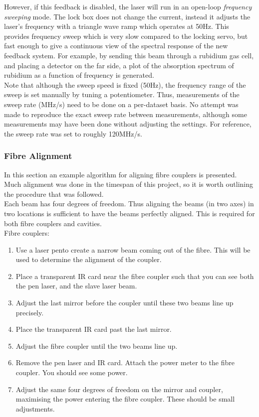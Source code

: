 However, if this feedback is disabled, the laser will run in an open-loop \emph{frequency sweeping} mode.  The lock box does not change the current, instead it adjusts the laser's frequency with a triangle wave ramp which operates at 50Hz.  This provides frequency sweep which is very slow compared to the locking servo, but fast enough to give a continuous view of the spectral response of the new feedback system.  For example, by sending this beam through a rubidium gas cell, and placing a detector on the far side, a plot of the absorption spectrum of rubidium as a function of frequency is generated. \\

Note that although the sweep speed is fixed (50Hz), the frequency range of the sweep is set manually by tuning a potentiometer.  Thus, measurements of the sweep rate (MHz/s) need to be done on a per-dataset basis.  No attempt was made to reproduce the exact sweep rate between measurements, although some measurements may have been done without adjusting the settings.  For reference, the sweep rate was set to roughly 120MHz/s. \\

    \subsubsection{Fibre Alignment}

In this section an  example algorithm for aligning fibre couplers is presented.  Much alignment was done in the timespan of this project, so it is worth outlining the procedure that was followed. \\

Each beam has four degrees of freedom.  Thus aligning the beams (in two axes) in two locations is sufficient to have the beams perfectly aligned.  This is required for both fibre couplers and cavities. \\

Fibre couplers:

\begin{enumerate}
 \item Use a laser pen\footnotemark to create a narrow beam coming out of the fibre.  This will be used to determine the alignment of the coupler.
 \item Place a transparent IR card near the fibre coupler such that you can see both the pen laser, and the slave laser beam.
 \item Adjust the last mirror before the coupler until these two beams line up precisely.
 \item Place the transparent IR card past the last mirror.
 \item Adjust the fibre coupler until the two beams line up.
 \item Remove the pen laser and IR card.  Attach the power meter to the fibre coupler.  You should see some power.
 \item Adjust the same four degrees of freedom on the mirror and coupler, maximising the power entering the fibre coupler.  These should be small adjustments.
\end{enumerate}

